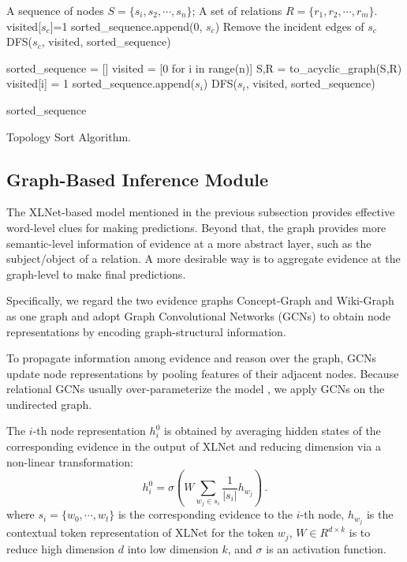 \documentclass[letterpaper]{article} \usepackage{aaai20}  \usepackage{times}  \usepackage{helvet} \usepackage{courier}  \usepackage[hyphens]{url}  \usepackage{graphicx} \urlstyle{rm} \def\UrlFont{\rm}  \usepackage{graphicx}  \frenchspacing  \setlength{\pdfpagewidth}{8.5in}  \setlength{\pdfpageheight}{11in}
\begin{document}
\begin{algorithm}[t]
\centering
\footnotesize
\begin{algorithmic}[1]
\Require
A sequence of nodes $S = \{s_i, s_2, \cdots, s_n\}$; A set of relations  $R = \{r_1, r_2, \cdots, r_m\}$. 
\State
visited[$s_c$]=1
\State
sorted\_sequence.append(0, $s_c$)
\State Remove the incident edges of $s_c$
\State DFS($s_c$, visited, sorted\_sequence)
\EndIf
\EndFor

\EndFunction
\State
sorted\_sequence = []
\State
visited = [0 for i in range(n)]
\State
S,R = to\_acyclic\_graph(S,R)
\State
visited[i] = 1
\State sorted\_sequence.append($s_i$)
\State
DFS($s_i$, visited, sorted\_sequence)


\EndIf
\EndFor
\State
\Return sorted\_sequence
\end{algorithmic}
\caption{Topology Sort Algorithm.}
\label{alg:training}
\end{algorithm}


\subsection{Graph-Based Inference Module}
The XLNet-based model mentioned in the previous subsection provides effective word-level clues for making predictions.
Beyond that, the graph provides more semantic-level information of evidence at a more abstract layer, such as the subject/object of a relation.
A more desirable way is to aggregate evidence at the 
graph-level to make final predictions.

Specifically, we regard the two evidence graphs Concept-Graph and Wiki-Graph as one graph and adopt Graph Convolutional Networks (GCNs) \cite{kipf2016semi} to obtain node representations by encoding graph-structural information.

To propagate information among evidence and reason over the graph, GCNs update node representations by pooling features of their adjacent nodes. Because relational GCNs usually over-parameterize the model \cite{marcheggiani2017encoding,zhang2018graph}, we apply GCNs on the undirected graph.

The $i$-th node representation $h^{0}_i$ is obtained by averaging hidden states of the corresponding evidence in the output of XLNet and reducing dimension via a non-linear transformation: 
\begin{equation}\label{hidden_state}
h^{0}_i=\sigma(W\sum_{w_j\in s_i}\frac{1}{|s_i|}h_{w_j}) \,.
\end{equation} 
where $s_i=\{w_0,\cdots,w_t\}$ is the corresponding evidence to the $i$-th node, $h_{w_j}$ is the contextual token representation of XLNet for the token $w_j$, $W \in R^{d\times k}$ is to reduce high dimension $d$ into low dimension $k$, and $\sigma$ is an activation function.  
\end{document}
